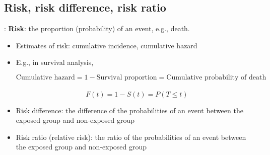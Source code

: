 \subsection{Risk, risk difference, risk ratio}
\begin{frame}{\secname: \subsecname}
	\textbf{Risk}: the proportion (probability) of an event, e.g., death. \\ 
	\begin{itemize}
		\item<2|handout:2-> Estimates of risk: cumulative incidence, cumulative hazard
		\item<3|handout:3-> E.g., in survival analysis, 

	\small
\[ \text{Cumulative hazard} = 1 - \text{Survival proportion} = \text{Cumulative probability of death}\] \\
	\[ F(t) = 1 - S(t) = P(T\leq t) \]
	\end{itemize}
\begin{itemize}
\normalsize
\item<4|handout:4-> Risk difference: the difference of the probabilities of an event between the exposed group and non-exposed group
\item<5|handout:5> Risk ratio (relative risk): the ratio of the probabilities of an event between the exposed group and non-exposed group
\end{itemize}
\end{frame}

